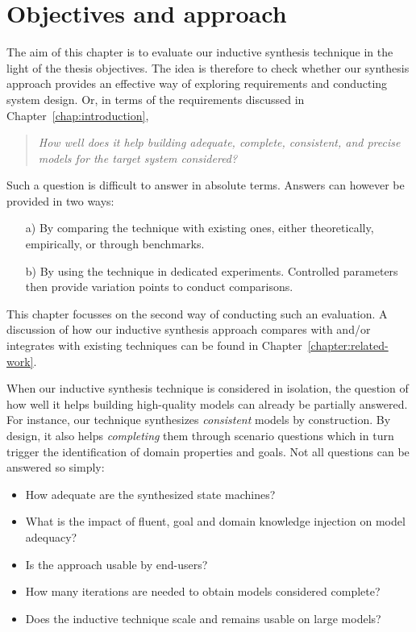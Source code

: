 \section{Objectives and approach\label{section:evaluation-objectives-and-approach}}

The aim of this chapter is to evaluate our inductive synthesis technique in the light of the thesis objectives. The idea is therefore to check whether our synthesis approach provides an effective way of exploring requirements and conducting system design. Or, in terms of the requirements discussed in Chapter~\ref{chap:introduction},

\begin{quotation}
\emph{How well does it help building \emph{adequate}, \emph{complete}, \emph{consistent}, and \emph{precise} models for the target system considered?}
\end{quotation}

Such a question is difficult to answer in absolute terms. Answers can however be provided in two ways:
\begin{enumerate}
\item[a)] By comparing the technique with existing ones, either theoretically, empirically, or through benchmarks.
\item[b)] By using the technique in dedicated experiments. Controlled parameters then provide variation points to conduct comparisons.
\end{enumerate}
This chapter focusses on the second way of conducting such an evaluation. A discussion of how our inductive synthesis approach compares with and/or integrates with existing techniques can be found in Chapter~\ref{chapter:related-work}.

When our inductive synthesis technique is considered in isolation, the question of how well it helps building high-quality models can already be partially answered. For instance, our technique synthesizes \emph{consistent} models by construction. By design, it also helps \emph{completing} them through scenario questions which in turn trigger the identification of domain properties and goals. Not all questions can be answered so simply:
\begin{itemize}
\item How adequate are the synthesized state machines? 
\item What is the impact of fluent, goal and domain knowledge injection on model adequacy?
\item Is the approach usable by end-users? 
\item How many iterations are needed to obtain models considered complete?
\item Does the inductive technique scale and remains usable on large models?
\end{itemize}

